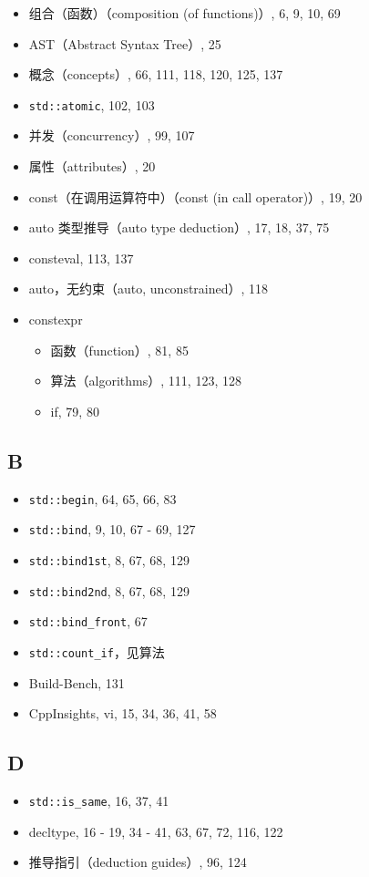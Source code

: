 \begin{itemize}
\item 组合（函数）（composition (of functions)）, 6, 9, 10, 69
\item AST（Abstract Syntax Tree）, 25
\item 概念（concepts）, 66, 111, 118, 120, 125, 137
\item \texttt{std::atomic}, 102, 103
\item 并发（concurrency）, 99, 107
\item 属性（attributes）, 20
\item const（在调用运算符中）（const (in call operator)）, 19, 20
\item auto 类型推导（auto type deduction）, 17, 18, 37, 75
\item consteval, 113, 137
\item auto，无约束（auto, unconstrained）, 118
\item constexpr
  \begin{itemize}
  \item 函数（function）, 81, 85
  \item 算法（algorithms）, 111, 123, 128
  \item if, 79, 80
  \end{itemize}
\end{itemize}

\subsection{B}

\begin{itemize}
\item \texttt{std::begin}, 64, 65, 66, 83
\item \texttt{std::bind}, 9, 10, 67 - 69, 127
\item \texttt{std::bind1st}, 8, 67, 68, 129
\item \texttt{std::bind2nd}, 8, 67, 68, 129
\item \texttt{std::bind\_front}, 67
\item \texttt{std::count\_if}，见算法
\item Build-Bench, 131
\item CppInsights, vi, 15, 34, 36, 41, 58
\end{itemize}

\subsection{D}

\begin{itemize}
\item \texttt{std::is\_same}, 16, 37, 41
\item decltype, 16 - 19, 34 - 41, 63, 67, 72, 116, 122
\item 推导指引（deduction guides）, 96, 124
\end{itemize}


